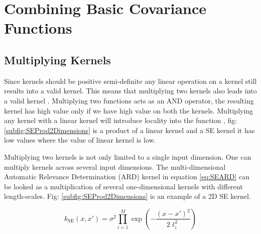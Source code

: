 \chapter{Combining Basic Covariance Functions}
\label{chapCombiningBasicCovariances}

\section{Multiplying Kernels} \label{subsec:structureKernelsMultiplyingKernels}
Since kernels should be positive semi-definite any linear operation on a kernel still results into a valid kernel. This means that multiplying two kernels also leads into a valid kernel \cite{bishop2006pattern} \cite{mackay2003information}. Multiplying two functions acts as an AND operator, the resulting kernel has high value only if we have high value on both the kernels. Multiplying any kernel with a linear kernel will introduce locality into the function , fig: \ref{subfig:SEProd2Dimensions} is a product of a linear kernel and a SE kernel it has low values where the value of linear kernel is low.

Multiplying two kernels is not only limited to a single input dimension. One can multiply kernels across several input dimensions. The multi-dimensional Automatic Relevance Determination (ARD) kernel in equation \ref{eq:SEARD} can be looked as a multiplication of several one-dimensional kernels with different length-scales. Fig: \ref{subfig:SEProd2Dimensions} is an example of a 2D SE kernel.

\begin{equation}\label{eq:SEARD}
k_{\textrm{SE}}(x, x') = \sigma^2\prod_{i=1}^{M}\exp\left(-\frac{(x - x')^2}{2\ell_{i}^2}\right)
\end{equation}

